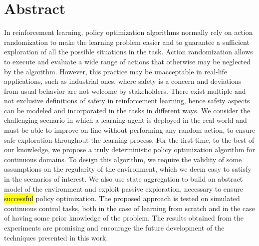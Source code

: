 
\begingroup
\let\clearpage\relax
\let\cleardoublepage\relax
\let\cleardoublepage\relax

\chapter*{Abstract}
In reinforcement learning, policy optimization algorithms normally rely on action randomization to make the learning problem easier and to guarantee a sufficient exploration of all the possible situations in the task. Action randomization allows to execute and evaluate a wide range of actions that otherwise may be neglected by the algorithm. However, this practice may be unacceptable in real-life applications, such as industrial ones, where safety is a concern and deviations from usual behavior are not welcome by stakeholders. There exist multiple and not exclusive definitions of safety in reinforcement learning, hence safety aspects can be modeled and incorporated in the tasks in different ways. We consider the challenging scenario in which a learning agent is deployed in the real world and must be able to improve on-line without performing any random action, to ensure safe exploration throughout the learning process. For the first time, to the best of our knowledge, we propose a truly deterministic policy optimization algorithm for continuous domains. To design this algorithm, we require the validity of some assumptions on the regularity of the environment, which we deem easy to satisfy in the scenarios of interest. We also use state aggregation to build an abstract model of the environment and exploit passive exploration, necessary to ensure \hl{successful} policy optimization. The proposed approach is tested on simulated continuous control tasks, both in the case of learning from scratch and in the case of having some prior knowledge of the problem. The results obtained from the experiments are promising and encourage the future development of the techniques presented in this work.

\vfill
\newpage
{}

